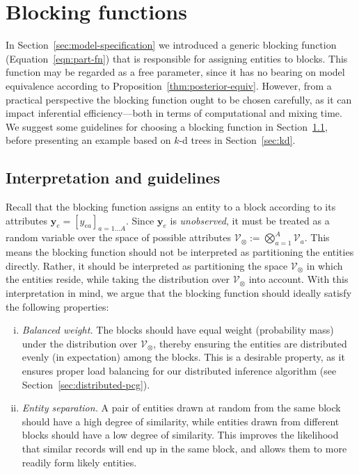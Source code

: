 \documentclass[12pt,letterpaper]{article}
\renewcommand\vec{\bm}
\newcommand{\valset}{\mathcal{V}} %
\newcommand{\1}[1]{\mathbb{I}\!\left[#1\right]} %
\begin{document}
\section{Blocking functions}
\label{sec:partition-fn}
In Section~\ref{sec:model-specification} we introduced a generic blocking 
function (Equation~\ref{eqn:part-fn}) that is responsible for assigning 
entities to blocks.
This function may be regarded as a free parameter, 
since it has no bearing on model equivalence according to 
Proposition~\ref{thm:posterior-equiv}.
However, from a practical perspective the blocking function ought to be 
chosen carefully, as it can impact inferential efficiency---both in 
terms of computational and mixing time.
We suggest some guidelines for choosing a blocking function in 
Section~\ref{sec:interpret}, before presenting an example based on $k$-d trees 
in Section~\ref{sec:kd}.

\subsection{Interpretation and guidelines}
\label{sec:interpret}
Recall that the blocking function assigns an entity to 
a block according to its attributes 
$\vec{y}_{e} = [y_{ea}]_{a = 1 \ldots A}$.
Since $\vec{y}_{e}$ is \emph{unobserved}, it must be treated 
as a random variable over the space of possible attributes 
$\valset_\otimes := \bigotimes_{a=1}^{A} \valset_{a}$.
This means the blocking function should not be interpreted 
as partitioning the entities directly.
Rather, it should be interpreted as partitioning the space 
$\valset_\otimes$ in which the entities reside, while taking 
the distribution over $\valset_\otimes$ into account.
With this interpretation in mind, we argue that the 
blocking function should ideally satisfy the following 
properties:
\begin{enumerate}[(i)]
  \item \emph{Balanced weight.} The blocks should have 
  equal weight (probability mass) under the distribution 
  over $\valset_\otimes$, thereby ensuring the entities are 
  distributed evenly (in expectation) among the blocks.
  This is a desirable property, as it ensures proper load balancing 
  for our distributed inference algorithm (see 
  Section~\ref{sec:distributed-pcg}).
  \item \emph{Entity separation.} A pair of entities drawn at 
  random from the same block should have a high degree of 
  similarity, while entities drawn from different blocks 
  should have a low degree of similarity.
  This improves the likelihood that similar records will 
  end up in the same block, and allows them to more 
  readily form likely entities.
\end{enumerate}
\end{document}
